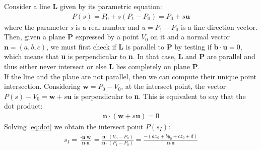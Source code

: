 Consider a line \textbf{L} given by its parametric equation:
\begin{align}
	P(s)= P_0 +s(P_1-P_0)= P_0+s\textbf{u}
\end{align}
where the parameter \emph{s} is a real number and $u=P_1-P_0$ is a line direction vector. Then, given a plane \textbf{P} expressed by a point $V_0$ on it and a normal vector $\textbf{n}=(a,b,c)$, we must first check if \textbf{L} is parallel to \textbf{P} by testing if $\textbf{b}\cdot\textbf{u}=0$, which means that \textbf{u} is perpendicular to \textbf{n}. In that case, \textbf{L} and \textbf{P} are parallel and thus either never intersect or else \textbf{L} lies completely on plane \textbf{P}.\\
If the line and the plane are not parallel, then we can compute their unique point intersection. Considering $\textbf{w} = P_0-V_0$, at the intersect point, the vector $P(s)-V_0=\textbf{w}+s\textbf{u}$ is perpendicular to \textbf{n}. This is equivalent to say that the dot product:
\begin{align}
	\textbf{n}\cdot(\textbf{w}+s\textbf{u})=0 \label{eq:dot}
\end{align}
Solving \ref{eq:dot} we obtain the intersect point $P(s_I)$:
\begin{align}\label{eq:intersection}
	s_I = \frac{\textbf{-n}\cdot\textbf{w}}{\textbf{n}\cdot\textbf{u}}=\frac{\textbf{n}\cdot(V_0-P_0)}{\textbf{n}\cdot(P_1-P_0)}=\frac{-(ax_0+by_0+cz_0+d)}{\textbf{n}\cdot\textbf{u}}
\end{align}
